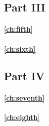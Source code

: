 \subsection*{Part III}

\paragraph{\autoref{ch:fifth}}

\paragraph{\autoref{ch:sixth}}

\subsection*{Part IV}

\paragraph{\autoref{ch:seventh}}

\paragraph{\autoref{ch:eighth}}


